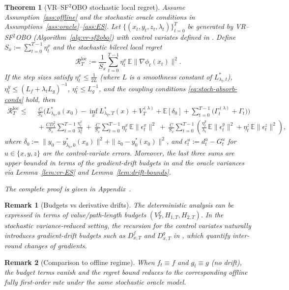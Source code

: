 \documentclass{uai2026} %
\newtheorem{theorem}{Theorem}[section]
\newtheorem{remark}{Remark}[section]
\newcommand{\EE}{\mathbb{E}}
\begin{document}
\begin{theorem}[VR--SF$^2$OBO stochastic local regret]\label{thm:stoch}
Assume Assumption~\ref{ass:offline} and the stochastic oracle conditions in Assumptions~\ref{ass:oracle}–\ref{ass:ES}.
Let $\{(x_t,y_t,z_t,\lambda_t)\}_{t=0}^{T}$ be generated by VR--SF$^2$OBO (Algorithm~\ref{alg:vr-sf2obo}) with control variates defined in .
Define $S_x:=\sum_{t=0}^{T-1}\eta_t^x$ and the stochastic bilevel local regret
\[
\mathcal{R}^{\mathrm{loc}}_T:=\frac{1}{S_x}\sum_{t=0}^{T-1}\eta_t^x\,\EE\|\nabla\phi_t(x_t)\|^2 .
\]
If the step sizes satisfy $\eta_t^x\le \frac{1}{2L}$ (where $L$ is a smoothness constant of $L^{*}_{\lambda_t,t}$), $\eta_t^y\le (L_f+\lambda_tL_g)^{-1}$, $\eta_t^z\le L_g^{-1}$, and the coupling conditions \eqref{eq:stoch-absorb-conds} hold, then
\begin{align}
\mathcal{R}^{\mathrm{loc}}_T
\le\;&\ \frac{C}{S_x}\Big(L^{*}_{\lambda_0,0}(x_0)-\inf_x L^{*}_{\lambda_T,T}(x) + V_T^{(\lambda)} + \EE[\delta_0] + \sum_{t=0}^{T-1}\big(\Gamma_t^{(\lambda)}+\Gamma_t\big)\Big)\label{eq:thm-stoch-main}\\
&\ +\frac{C D_1^2}{S_x}\sum_{t=0}^{T-1}\frac{\eta_t^x}{\lambda_t^2}
~+~\frac{C}{S_x}\sum_{t=0}^{T-1}\eta_t^x\,\EE\|\epsilon_t^x\|^2
~+~\frac{C}{S_x}\sum_{t=0}^{T-1}\left(\frac{\eta_t^y}{\lambda_t}\,\EE\|\epsilon_t^y\|^2+\eta_t^z\,\EE\|\epsilon_t^z\|^2\right),\nonumber
\end{align}
where $\delta_0:=\|y_0-y^{*}_{\lambda_0,0}(x_0)\|^2+\|z_0-y_0^{*}(x_0)\|^2$, and $\epsilon_t^u:=d_t^u-G_t^u$ for $u\in\{x,y,z\}$ are the control-variate errors.
Moreover, the last three sums are upper bounded in terms of the gradient-drift budgets in  and the oracle variances via Lemma~\ref{lem:vr-ES} and Lemma~\ref{lem:drift-bounds}.

\smallskip
\noindent The complete proof is given in Appendix~.
\end{theorem}
\begin{remark}[Budgets vs derivative drifts]\label{rem:drifts}
The deterministic analysis can be expressed in terms of value/path-length budgets $(V_T^f,H_{1,T},H_{2,T})$.
In the stochastic variance-reduced setting, the recursion for the control variates naturally introduces \emph{gradient-drift} budgets
such as $D^f_{x,T}$ and $D^g_{x,T}$ in , which quantify inter-round changes of gradients.
\end{remark}
\begin{remark}[Comparison to offline regime]
When $f_t\equiv f$ and $g_t\equiv g$ (no drift), the budget terms vanish and the regret bound reduces to the corresponding
offline fully first-order rate under the same stochastic oracle model.
\end{remark}
\end{document}
